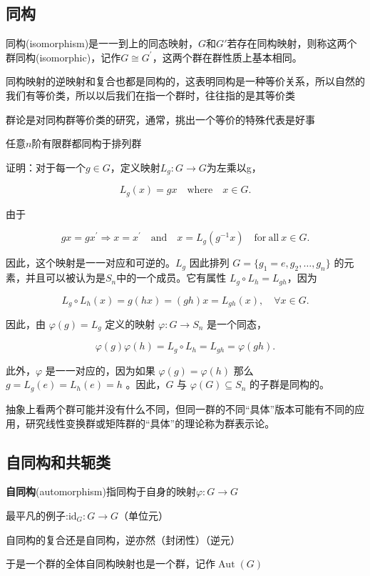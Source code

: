 \subsection{同构}
同构(isomorphism)是一一到上的同态映射，$G$和$G'$若存在同构映射，则称这两个群同构(isomorphic)，记作$G \cong G^{\prime}$，这两个群在群性质上基本相同。

同构映射的逆映射和复合也都是同构的，这表明同构是一种等价关系，所以自然的我们有等价类，所以以后我们在指一个群时，往往指的是其等价类

群论是对同构群等价类的研究，通常，挑出一个等价的特殊代表是好事
\begin{theorem}[Cayley]
    任意$n$阶有限群都同构于排列群

    证明：对于每一个$g\in G$，定义映射$L_{g} : G\to G$为左乘以g，

    $$
    L_{g}(x)=gx\quad\mathrm{where}\quad x\in G.
    $$
    
    由于
    
    $$
    gx=gx^{\prime}\Longrightarrow x=x^{\prime}\quad\mathrm{and}\quad x=L_{g}(g^{-1}x)\quad\mathrm{for~all~}x\in G.
    $$
    
    因此，这个映射是一一对应和可逆的。$L_g$ 因此排列 $G=\{g_1=e,g_2,\ldots,g_n\}$ 的元素，并且可以被认为是$S_n$中的一个成员。它有属性 $L_g\circ L_h=L_{gh}$，因为
    
    $$
    L_{g}\circ L_{h}(x)=g(hx)=(gh)x=L_{gh}(x),\quad\forall x\in G.
    $$
    
    因此，由 $\varphi(g)=L_g$ 定义的映射 $\varphi:G\to S_n$ 是一个同态，
    
    $$
    \varphi(g)\varphi(h)=L_{g}\circ L_{h}=L_{gh}=\varphi(gh).
    $$
    
    此外，$\varphi$ 是一一对应的，因为如果 $\varphi(g)=\varphi(h)$ 那么 $g=L_g(e)=L_h(e)=h$ 。因此，$G$ 与 $\varphi(G)\subseteq S_{n}$ 的子群是同构的。
\end{theorem}
抽象上看两个群可能并没有什么不同，但同一群的不同“具体”版本可能有不同的应用，研究线性变换群或矩阵群的“具体”的理论称为群表示论。
\subsection{自同构和共轭类}
\textbf{自同构}(automorphism)指同构于自身的映射$\varphi: G \rightarrow G$

最平凡的例子:$\mathrm{id}_{G}: G \rightarrow G$（单位元）

自同构的复合还是自同构，逆亦然（封闭性）（逆元）

于是一个群的全体自同构映射也是一个群，记作$\operatorname{Aut}(G)$

